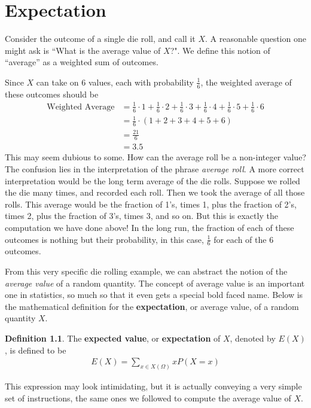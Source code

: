 \documentclass{tufte-book}
\theoremstyle{definition}
\numberwithin{theorem}{section}
\newtheorem{definition}[theorem]{Definition}
\numberwithin{definition}{section}
\numberwithin{lemma}{section}
\numberwithin{corollary}{section}
\numberwithin{proposition}{section}
\numberwithin{remark}{section}
\numberwithin{claim}{section}
\numberwithin{observation}{section}
\numberwithin{fact}{section}
\numberwithin{assumption}{section}
\numberwithin{example}{section}
\numberwithin{exercise}{section}
\begin{document}
\chapter{Expectation}
Consider the outcome of a single die roll, and call it $X$. A reasonable question one might ask is ``What is the average value of $X$?". We define this notion of ``average'' as a weighted sum of outcomes. 

Since $X$ can take on 6 values, each with probability $\frac{1}{6}$, the weighted average of these outcomes should be
\begin{align*}
\text{Weighted Average} &= \frac{1}{6} \cdot 1 + \frac{1}{6} \cdot 2 + \frac{1}{6} \cdot 3 + \frac{1}{6} \cdot 4 + \frac{1}{6} \cdot 5 + \frac{1}{6} \cdot 6 \\
&= \frac{1}{6} \cdot (1 + 2 + 3 + 4 + 5 + 6) \\
&= \frac{21}{6} \\
&= 3.5
\end{align*}
This may seem dubious to some. How can the average roll be a non-integer value? The confusion lies in the interpretation of the phrase \textit{average roll}. A more correct interpretation would be the long term average of the die rolls. Suppose we rolled the die many times, and recorded each roll. Then we took the average of all those rolls. This average would be the fraction of 1's, times 1, plus the fraction of 2's, times 2, plus the fraction of 3's, times 3, and so on. But this is exactly the computation we have done above! In the long run, the fraction of each of these outcomes is nothing but their probability, in this case, $\frac{1}{6}$ for each of the 6 outcomes.

From this very specific die rolling example, we can abstract the notion of the \textit{average value} of a random quantity. The concept of average value is an important one in statistics, so much so that it even gets a special bold faced name. Below is the mathematical definition for the \textbf{expectation}, or average value, of a random quantity $X$.

\begin{definition}
The \textbf{expected value}, or \textbf{expectation} of $X$, denoted by $E(X)$, is defined to be
\begin{align*}
E(X) = \sum_{x \in X(\Omega)}  x P(X = x)
\end{align*}
\end{definition}
This expression may look intimidating, but it is actually conveying a very simple set of instructions, the same ones we followed to compute the average value of $X$.
\end{document}
